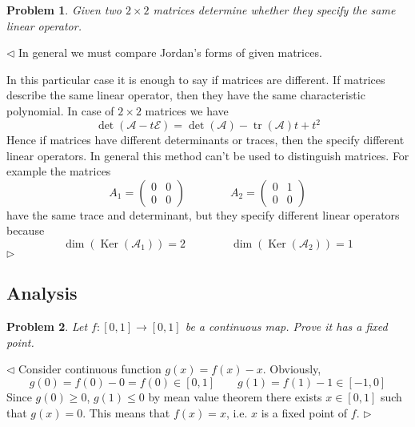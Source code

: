 \documentclass[12pt]{article}
\newtheorem{problem}{Problem}[subsection]
\newenvironment{solution}{\par $\triangleleft$}{$\triangleright$}
\begin{document}
\begin{problem} Given two $2\times 2$ matrices determine whether they specify the same linear operator.
\end{problem}
\begin{solution} In general we must compare Jordan's forms of given matrices. 
 
In this particular case it is enough to say if matrices are different. If matrices describe the same linear operator, then they have the same characteristic polynomial. In case of $2\times 2$ matrices we have
$$
\det(\mathcal{A}-t\mathcal{E})= \det(\mathcal{A})-\operatorname{tr}(\mathcal{A}) t+t^2
$$
Hence if matrices have different determinants or traces, then the specify different linear operators. In general this method can't be used to distinguish matrices. For example the matrices
$$
A_1=\begin{pmatrix}0&0\\0&0\end{pmatrix}\qquad\qquad
A_2=\begin{pmatrix}0&1\\0&0\end{pmatrix}
$$
have the same trace and determinant, but they specify different linear operators because
$$
\operatorname{dim}(\operatorname{Ker}(\mathcal{A}_1))=2\qquad\qquad
\operatorname{dim}(\operatorname{Ker}(\mathcal{A}_2))=1
$$
\end{solution}
 
 
 
 
 
 
 
 
 
 
 
 
 
 
\newpage
 
\subsection{Analysis}
 
\begin{problem} Let $f\colon [0,1 ]\to[0,1]$ be a continuous map. Prove it has a fixed point.
\end{problem}
\begin{solution} Consider continuous function $g(x)=f(x)-x$. Obviously, 
$$
g(0)=f(0)-0=f(0)\in[0,1]\qquad g(1)=f(1)-1\in[-1,0]
$$
Since $g(0)\geq 0$, $g(1)\leq 0$ by mean value theorem there exists $x\in[0,1]$ such that $g(x)=0$. This means that $f(x)=x$, i.e. $x$ is a fixed point of $f$.
\end{solution}
 
\end{document}
